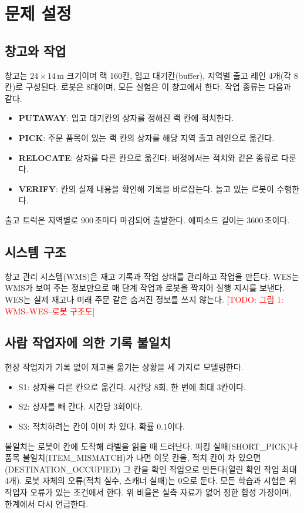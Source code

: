 \documentclass[conference]{IEEEtran}
\newcommand{\todo}[1]{\textcolor{red}{[TODO: #1]}}
\begin{document}
\section{문제 설정}

\subsection{창고와 작업}
창고는 $24\times14$\,m 크기이며 랙 160칸, 입고 대기칸(buffer), 지역별 출고 레인 4개(각 8칸)로 구성된다. 로봇은 8대이며, 모든 실험은 이 창고에서 한다. %
작업 종류는 다음과 같다.
\begin{itemize}
  \item \textbf{PUTAWAY}: 입고 대기칸의 상자를 정해진 랙 칸에 적치한다.
  \item \textbf{PICK}: 주문 품목이 있는 랙 칸의 상자를 해당 지역 출고 레인으로 옮긴다.
  \item \textbf{RELOCATE}: 상자를 다른 칸으로 옮긴다. 배정에서는 적치와 같은 종류로 다룬다.
  \item \textbf{VERIFY}: 칸의 실제 내용을 확인해 기록을 바로잡는다. 놀고 있는 로봇이 수행한다.
\end{itemize}
출고 트럭은 지역별로 900\,초마다 마감되어 출발한다. %
에피소드 길이는 3600\,초이다.

\subsection{시스템 구조}
창고 관리 시스템(WMS)은 재고 기록과 작업 상태를 관리하고 작업을 만든다.
WES는 WMS가 보여 주는 정보만으로 매 단계 작업과 로봇을 짝지어 실행 지시를 보낸다.
WES는 실제 재고나 미래 주문 같은 숨겨진 정보를 쓰지 않는다.
\todo{그림 1: WMS--WES--로봇 구조도}

\subsection{사람 작업자에 의한 기록 불일치}
현장 작업자가 기록 없이 재고를 옮기는 상황을 세 가지로 모델링한다.
\begin{itemize}
  \item S1: 상자를 다른 칸으로 옮긴다. 시간당 8회, 한 번에 최대 3칸이다.
  \item S2: 상자를 빼 간다. 시간당 3회이다.
  \item S3: 적치하려는 칸이 이미 차 있다. 확률 0.1이다.
\end{itemize}
불일치는 로봇이 칸에 도착해 라벨을 읽을 때 드러난다.
피킹 실패(SHORT\_PICK)나 품목 불일치(ITEM\_MISMATCH)가 나면 이웃 칸을, 적치 칸이 차 있으면(DESTINATION\_OCCUPIED) 그 칸을 확인 작업으로 만든다(열린 확인 작업 최대 4개). %
로봇 자체의 오류(적치 실수, 스캐너 실패)는 0으로 둔다.
모든 학습과 시험은 위 작업자 오류가 있는 조건에서 한다.
위 비율은 실측 자료가 없어 정한 합성 가정이며, 한계에서 다시 언급한다.
\end{document}
